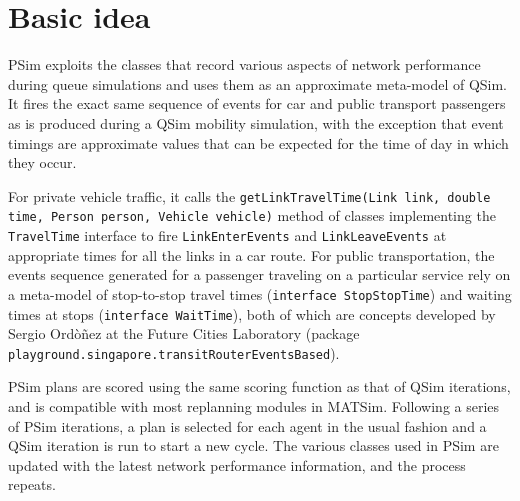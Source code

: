 \section{Basic idea}
PSim exploits the classes that record various aspects of network performance during queue simulations and uses them as an approximate meta-model of QSim. It fires the exact same sequence of events for car and public transport passengers as is produced during a QSim mobility simulation, with the exception that event timings are approximate values that can be expected for the time of day in which they occur.

For private vehicle traffic, it calls the \lstinline|getLinkTravelTime(Link link, double time, Person person, Vehicle vehicle)| method of classes implementing the \lstinline|TravelTime| interface to fire \lstinline|LinkEnterEvents| and \lstinline|LinkLeaveEvents| at appropriate times for all the links in a car route. For public transportation, the events sequence generated for a passenger traveling on a particular service rely on a meta-model of stop-to-stop travel times (\lstinline|interface StopStopTime|) and waiting times at stops (\lstinline|interface WaitTime|), both of which are concepts developed by Sergio Ord\`o\~nez at the Future Cities Laboratory (package \lstinline|playground.singapore.transitRouterEventsBased|).

PSim plans are scored using the same scoring function as that of QSim iterations, and is compatible with most replanning modules in MATSim. Following a series of PSim iterations, a plan is selected for each agent in the usual fashion and a QSim iteration is run to start a new cycle. The various classes used in PSim are updated with the latest network performance information, and the process repeats.


